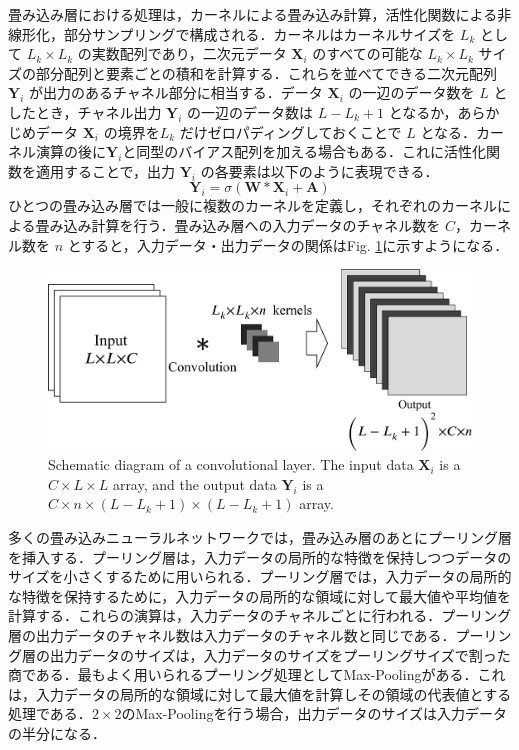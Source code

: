 畳み込み層における処理は，カーネルによる畳み込み計算，活性化関数による非線形化，部分サンプリングで構成される．カーネルはカーネルサイズを $L_{k}$ として $L_k \times L_k$ の実数配列であり，二次元データ $\bm{X}_i$ のすべての可能な $L_k \times L_k$ サイズの部分配列と要素ごとの積和を計算する．これらを並べてできる二次元配列 $\bm{Y}_i$ が出力のあるチャネル部分に相当する．データ $\bm{X}_i$ の一辺のデータ数を $L$ としたとき，チャネル出力 $\bm{Y}_i$ の一辺のデータ数は $L-L_k+1$ となるか，あらかじめデータ $\bm{X}_i$ の境界を$L_k$ だけゼロパディングしておくことで $L$ となる．カーネル演算の後に$\bm{Y}_i$と同型のバイアス配列を加える場合もある．これに活性化関数を適用することで，出力 $\bm{Y}_i$ の各要素は以下のように表現できる．
\begin{equation}
    \bm{Y}_i = \sigma \left( \bm{W} \ast \bm{X}_i + \bm{A} \right)
\end{equation}
ひとつの畳み込み層では一般に複数のカーネルを定義し，それぞれのカーネルによる畳み込み計算を行う．畳み込み層への入力データのチャネル数を $C$，カーネル数を $n$ とすると，入力データ・出力データの関係はFig. \ref{fig:convolutionalLayer}に示すようになる．
\begin{figure}[H]
    \centering
    \includegraphics[width=0.8\linewidth]{./Figure/2_Theory/cnn.pdf}
    \caption{Schematic diagram of a convolutional layer. The input data $\bm{X}_i$ is a $C\times L \times L$ array, and the output data $\bm{Y}_i$ is a $C\times n\times (L-L_k+1) \times (L-L_k+1)$ array.}
    \label{fig:convolutionalLayer}
\end{figure}

多くの畳み込みニューラルネットワークでは，畳み込み層のあとにプーリング層を挿入する．プーリング層は，入力データの局所的な特徴を保持しつつデータのサイズを小さくするために用いられる．プーリング層では，入力データの局所的な特徴を保持するために，入力データの局所的な領域に対して最大値や平均値を計算する．これらの演算は，入力データのチャネルごとに行われる．プーリング層の出力データのチャネル数は入力データのチャネル数と同じである．プーリング層の出力データのサイズは，入力データのサイズをプーリングサイズで割った商である．最もよく用いられるプーリング処理としてMax-Pooling\cite{nagi2011}がある．これは，入力データの局所的な領域に対して最大値を計算しその領域の代表値とする処理である．$2\times 2$のMax-Poolingを行う場合，出力データのサイズは入力データの半分になる．


